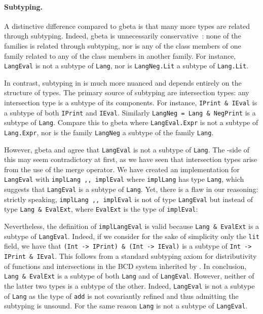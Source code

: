 \paragraph{Subtyping.}
A distinctive difference compared to \textsf{gbeta} is that many more \namee types are related through
subtyping. Indeed, \textsf{gbeta} is unnecessarily conservative~\citep{ernst_hoh}: none of the families is related
through subtyping, nor is any of the class members of one family related to any
of the class members in another family. For instance, \lstinline{LangEval} is
not a subtype of \lstinline{Lang}, nor is \lstinline{LangNeg.Lit} a subtype
of \lstinline{Lang.Lit}.

In contrast, subtyping in \namee is much more nuanced and depends entirely on the
structure of types. The primary source of subtyping are intersection types:
any intersection type is a subtype of its components. For instance, 
\lstinline{IPrint & IEval} is a subtype of both \lstinline{IPrint} and
\lstinline{IEval}. Similarly \lstinline{LangNeg = Lang & NegPrint} is a subtype
of \lstinline{Lang}. Compare this to \textsf{gbeta} where \lstinline{LangEval.Expr} is
not a subtype of \lstinline{Lang.Expr}, nor is the family \lstinline{LangNeg} a
subtype of the family \lstinline{Lang}.

However, \textsf{gbeta} and \namee agree that \lstinline{LangEval} is not a subtype of
\lstinline{Lang}. The \namee-side of this may seem contradictory at first, as we
have seen that intersection types arise from the use of the merge operator.
We have created an implementation for \lstinline{LangEval} with
\lstinline{implLang ,, implEval} where \lstinline{implLang} has type \lstinline{Lang}, which
suggests that \lstinline{LangEval} is a subtype of \lstinline{Lang}.
Yet, there is a flaw in our reasoning:
strictly speaking, \lstinline{implLang ,, implEval} is not of
type \lstinline{LangEval} but instead of type \lstinline{Lang & EvalExt}, where
\lstinline{EvalExt} is the type of \lstinline{implEval}:

Nevertheless, the definition of \lstinline{implLangEval} is valid because
\lstinline{Lang & EvalExt} is a subtype of \lstinline{LangEval}.
Indeed, if we consider for the sake of simplicity only the \lstinline{lit}
field, we have that \lstinline{(Int -> IPrint) & (Int -> IEval)} is a
subtype of \lstinline{Int -> IPrint & IEval}. This follows from a standard
subtyping axiom for distributivity of functions and intersections in the BCD system inherited by \namee.
In conclusion, \lstinline{Lang & EvalExt} is a subtype of both \lstinline{Lang}
and of \lstinline{LangEval}. However, neither of the latter two types is a subtype of the other.
Indeed, \lstinline{LangEval} is not a subtype of \lstinline{Lang} as the type
of \lstinline{add} is not covariantly refined and thus admitting the subtyping
is unsound. For the same reason \lstinline{Lang} is not a subtype of \lstinline{LangEval}.


